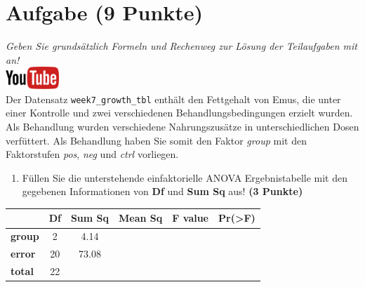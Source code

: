 \documentclass[a4paper, 9pt]{scrartcl}\usepackage[]{graphicx}\usepackage[]{xcolor}
\begin{document}
\clearpage

\section{Aufgabe \hfill (9 Punkte)}

\textit{Geben Sie grunds{\"a}tzlich Formeln und Rechenweg zur L{\"o}sung der
  Teilaufgaben mit an!} \\[1Ex]

\hfill\href{https://youtu.be/IhecxMcCENY}{\includegraphics[width =
  2cm]{img/youtube}}\\[1Ex]




Der Datensatz \texttt{week7\_growth\_tbl} enth{\"a}lt den Fettgehalt von
Emus, die unter einer Kontrolle und zwei verschiedenen
Behandlungsbedingungen erzielt wurden. Als Behandlung wurden verschiedene
Nahrungszus{\"a}tze in unterschiedlichen Dosen verf{\"u}ttert. Als Behandlung haben
Sie somit den Faktor \textit{group} mit den Faktorstufen
\textit{pos}, \textit{neg} und
\textit{ctrl} vorliegen.



\begin{enumerate}
\item F{\"u}llen Sie die unterstehende einfaktorielle ANOVA Ergebnistabelle 
  mit den gegebenen Informationen von \textbf{Df} und \textbf{Sum Sq} aus!
  \textbf{(3 Punkte)}
\end{enumerate}

\vspace{1Ex}

\begin{center}
  \Large
  \begin{tabular}{l|c|c|c|c|c}
     & \textbf{Df} & \textbf{Sum Sq} & \textbf{Mean Sq} & \textbf{F value} & \textbf{Pr(>F)} \strut\\
    \hline
   \textbf{group}  & 2 & 4.14 &  &  &  \strut\\
    \hline
   \textbf{error}  & 20 & 73.08 &  &  &  \strut\\
        \hline
   \textbf{total}  & 22 &  &  &  &  \strut\\
  \end{tabular}
\end{center}
\end{document}
